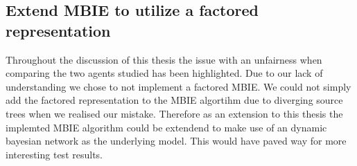 \subsection{Extend MBIE to utilize a factored representation}
\label{sec:factored_mbie}

Throughout the discussion of this thesis the issue with an unfairness when
comparing the two agents studied has been highlighted. Due to our lack of
understanding we chose to not implement a factored MBIE. We could not simply
add the factored representation to the MBIE algortihm due to diverging source
trees when we realised our mistake. Therefore as an extension to this thesis
the implemted MBIE algorithm could be extendend to make use of an dynamic
bayesian network as the underlying model. This would have paved way for more
interesting test results.
